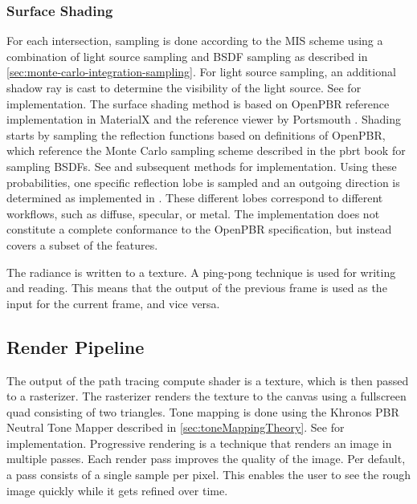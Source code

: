 \subsubsection{Surface Shading}

For each intersection, sampling is done according to the \gls{MIS} scheme using a combination of light source sampling and \gls{BSDF} sampling as described in \autoref{sec:monte-carlo-integration-sampling}. For light source sampling, an additional shadow ray is cast to determine the visibility of the light source. See  for implementation. The surface shading method is based on \gls{OpenPBR} reference implementation in \gls{MaterialX} and the reference viewer by Portsmouth \cite{openPbrViewer}. Shading starts by sampling the reflection functions based on definitions of \gls{OpenPBR}, which reference the Monte Carlo sampling scheme described in the \gls{pbrt} book \cite{Pharr_Physically_Based_Rendering_2023} for sampling \glspl{BSDF}. See  and subsequent methods for implementation. Using these probabilities, one specific reflection lobe is sampled and an outgoing direction is determined as implemented in . These different lobes correspond to different workflows, such as diffuse, specular, or metal. The implementation does not constitute a complete conformance to the \gls{OpenPBR} specification, but instead covers a subset of the features.

The radiance is written to a texture. A ping-pong technique is used for writing and reading. This means that the output of the previous frame is used as the input for the current frame, and vice versa.

\subsection*{Render Pipeline}

The output of the path tracing compute shader is a texture, which is then passed to a rasterizer. The rasterizer renders the texture to the canvas using a fullscreen quad consisting of two triangles. Tone mapping is done using the Khronos \gls{PBR} Neutral Tone Mapper described in \autoref{sec:toneMappingTheory}. See  for implementation. Progressive rendering is a technique that renders an image in multiple passes. Each render pass improves the quality of the image. Per default, a pass consists of a single sample per pixel. This enables the user to see the rough image quickly while it gets refined over time.


